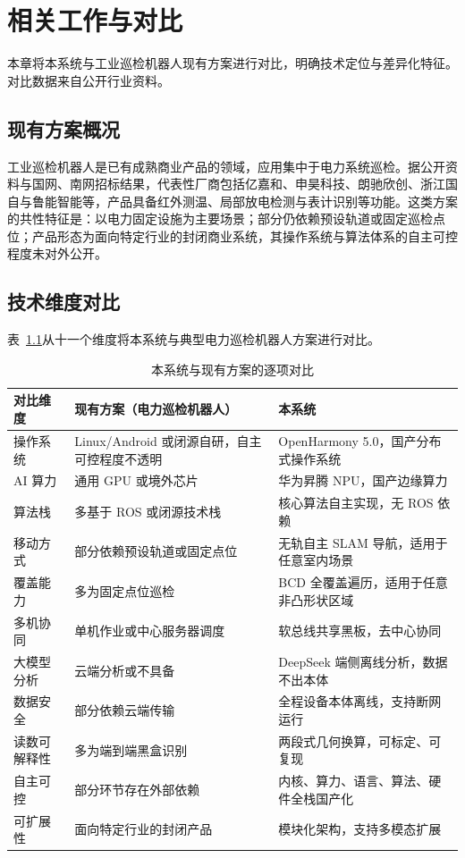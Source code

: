 \chapter{相关工作与对比}
\label{ch:related-work}

本章将本系统与工业巡检机器人现有方案进行对比，明确技术定位与差异化特征。对比数据来自公开行业资料。

\section{现有方案概况}
\label{sec:existing-solutions}

工业巡检机器人是已有成熟商业产品的领域，应用集中于电力系统巡检。据公开资料与国网、南网招标结果，代表性厂商包括亿嘉和、申昊科技、朗驰欣创、浙江国自与鲁能智能等，产品具备红外测温、局部放电检测与表计识别等功能。这类方案的共性特征是：以电力固定设施为主要场景；部分仍依赖预设轨道或固定巡检点位；产品形态为面向特定行业的封闭商业系统，其操作系统与算法体系的自主可控程度未对外公开。

\section{技术维度对比}
\label{sec:comparison-matrix}

表~\ref{tab:competitor-comparison}从十一个维度将本系统与典型电力巡检机器人方案进行对比。

\begin{table}[htbp]
\centering
\caption{本系统与现有方案的逐项对比}
\label{tab:competitor-comparison}
\small
\begin{tabularx}{\textwidth}{p{2.2cm}XX}
\toprule
\textbf{对比维度} & \textbf{现有方案（电力巡检机器人）} & \textbf{本系统} \\
\midrule
操作系统 & Linux/Android 或闭源自研，自主可控程度不透明 & OpenHarmony 5.0，国产分布式操作系统 \\
AI 算力 & 通用 GPU 或境外芯片 & 华为昇腾 NPU，国产边缘算力 \\
算法栈 & 多基于 ROS 或闭源技术栈 & 核心算法自主实现，无 ROS 依赖 \\
移动方式 & 部分依赖预设轨道或固定点位 & 无轨自主 SLAM 导航，适用于任意室内场景 \\
覆盖能力 & 多为固定点位巡检 & BCD 全覆盖遍历，适用于任意非凸形状区域 \\
多机协同 & 单机作业或中心服务器调度 & 软总线共享黑板，去中心协同 \\
大模型分析 & 云端分析或不具备 & DeepSeek 端侧离线分析，数据不出本体 \\
数据安全 & 部分依赖云端传输 & 全程设备本体离线，支持断网运行 \\
读数可解释性 & 多为端到端黑盒识别 & 两段式几何换算，可标定、可复现 \\
自主可控 & 部分环节存在外部依赖 & 内核、算力、语言、算法、硬件全栈国产化 \\
可扩展性 & 面向特定行业的封闭产品 & 模块化架构，支持多模态扩展 \\
\bottomrule
\end{tabularx}
\end{table}

